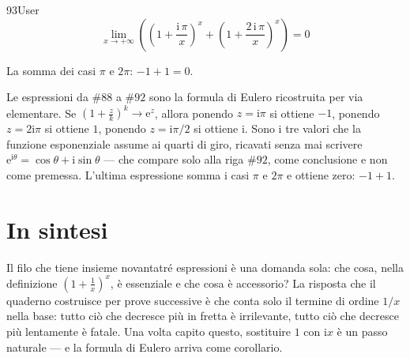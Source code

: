 \begin{espr}{93}{User}{}
\[
\lim_{x \to +\infty} \left(\left(1 + \frac{\mathrm{i}\, \pi}{x}\right)^{x} + \left(1 + \frac{2\, \mathrm{i}\, \pi}{x}\right)^{x}\right) = 0
\]
\end{espr}
La somma dei casi $\pi$ e $2\pi$: $-1+1=0$.


Le espressioni da $\#88$ a $\#92$ sono la formula di Eulero ricostruita per via elementare. Se $\left(1+\tfrac{z}{k}\right)^k\to\mathrm{e}^z$, allora ponendo $z=\mathrm{i}\pi$ si ottiene $-1$, ponendo $z=2\mathrm{i}\pi$ si ottiene $1$, ponendo $z=\mathrm{i}\pi/2$ si ottiene $\mathrm{i}$. Sono i tre valori che la funzione esponenziale assume ai quarti di giro, ricavati senza mai scrivere $\mathrm{e}^{\mathrm{i}\theta}=\cos\theta+\mathrm{i}\sin\theta$ — che compare solo alla riga $\#92$, come conclusione e non come premessa. L'ultima espressione somma i casi $\pi$ e $2\pi$ e ottiene zero: $-1+1$.

\section*{In sintesi}

Il filo che tiene insieme novantatré espressioni è una domanda sola: che cosa, nella definizione $\left(1+\tfrac1x\right)^x$, è essenziale e che cosa è accessorio? La risposta che il quaderno costruisce per prove successive è che conta solo il termine di ordine $1/x$ nella base: tutto ciò che decresce più in fretta è irrilevante, tutto ciò che decresce più lentamente è fatale. Una volta capito questo, sostituire $1$ con $\mathrm{i}x$ è un passo naturale — e la formula di Eulero arriva come corollario.

